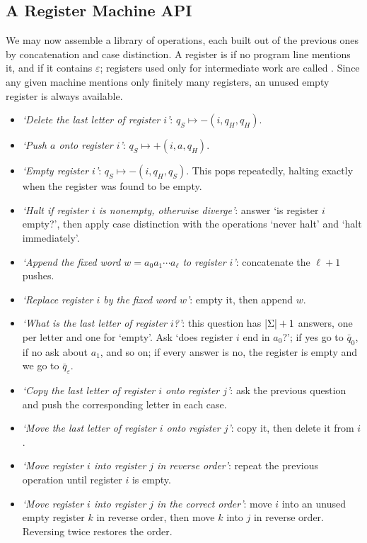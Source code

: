 \documentclass[a4paper]{scrartcl}
\newcommand{\eps}{\varepsilon}
\begin{document}
\subsection{A Register Machine API}\label{sec:api}

We may now assemble a library of operations, each built out of the previous ones by concatenation and case distinction. A register is  if no program line mentions it, and  if it contains $\eps$; registers used only for intermediate work are called . Since any given machine mentions only finitely many registers, an unused empty register is always available.

\begin{itemize}
	\item \emph{`Delete the last letter of register $i$'}: $q_S \mapsto -(i,q_H,q_H)$.
	\item \emph{`Push $a$ onto register $i$'}: $q_S \mapsto +(i,a,q_H)$.
	\item \emph{`Empty register $i$'}: $q_S \mapsto -(i,q_H,q_S)$. This pops repeatedly, halting exactly when the register was found to be empty.
	\item \emph{`Halt if register $i$ is nonempty, otherwise diverge'}: answer `is register $i$ empty?', then apply case distinction with the operations `never halt' and `halt immediately'.
	\item \emph{`Append the fixed word $w = a_0a_1\cdots a_\ell$ to register $i$'}: concatenate the $\ell+1$ pushes.
	\item \emph{`Replace register $i$ by the fixed word $w$'}: empty it, then append $w$.
	\item \emph{`What is the last letter of register $i$?'}: this question has $\lvert\Sigma\rvert+1$ answers, one per letter and one for `empty'. Ask `does register $i$ end in $a_0$?'; if yes go to $\bar q_0$, if no ask about $a_1$, and so on; if every answer is no, the register is empty and we go to $\bar q_\eps$.
	\item \emph{`Copy the last letter of register $i$ onto register $j$'}: ask the previous question and push the corresponding letter in each case.
	\item \emph{`Move the last letter of register $i$ onto register $j$'}: copy it, then delete it from $i$.
	\item \emph{`Move register $i$ into register $j$ in reverse order'}: repeat the previous operation until register $i$ is empty.
	\item \emph{`Move register $i$ into register $j$ in the correct order'}: move $i$ into an unused empty register $k$ in reverse order, then move $k$ into $j$ in reverse order. Reversing twice restores the order.

\end{itemize}
\end{document}
